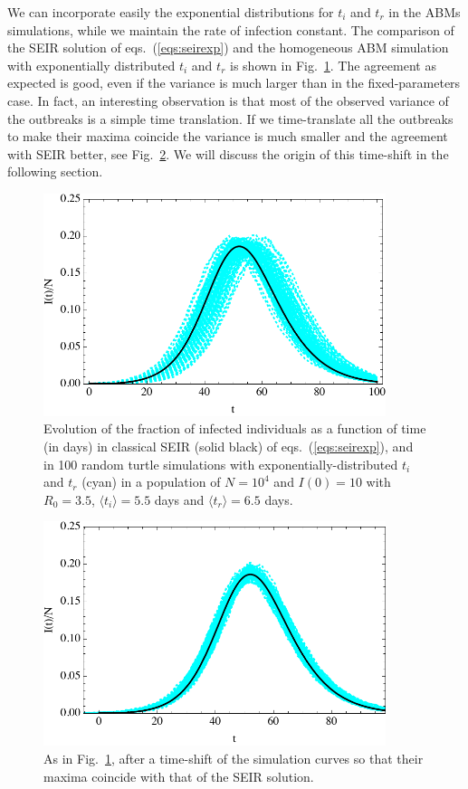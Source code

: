 \documentclass[10pt,letterpaper]{article}
\begin{document}
We can incorporate easily  the exponential distributions for $t_i$ and $t_r$ in the ABMs simulations, while we maintain the rate of infection constant. 
The comparison of the SEIR solution of eqs.~(\ref{eqs:seirexp}) and the homogeneous ABM simulation with exponentially distributed $t_i$ and $t_r$ is shown in Fig.~\ref{fig:exp}. The agreement as expected is good, even if the variance is much larger than in the fixed-parameters case. In fact, an interesting observation is that most of the observed variance 
of the outbreaks is a simple time translation. If we time-translate all the outbreaks to make their maxima coincide the variance is much smaller and the agreement with SEIR better, see Fig.~\ref{fig:expshift}. We will discuss the origin of this time-shift in the following section. 
\begin{figure}[h!]
  \centering
  \includegraphics[width=10cm]{exp.pdf}
  \caption{ Evolution of the fraction of infected individuals as a function of time (in days) in classical SEIR (solid black) of eqs.~(\ref{eqs:seirexp}), and in 100 random turtle simulations with exponentially-distributed
  $t_i$ and $t_r$ (cyan) in a  population of $N=10^4$ and $I(0)=10$ with $R_0=3.5$, $\langle t_i\rangle=5.5$ days and $\langle t_r\rangle=6.5$ days.  }
  \label{fig:exp}
   \end{figure}
   
   \begin{figure}[h!]
  \centering
  \includegraphics[width=10cm]{expshift.pdf}
  \caption{ As in Fig.~\ref{fig:exp}, after a time-shift of the simulation curves so that their maxima coincide with that of the SEIR solution.  }
  \label{fig:expshift}
   \end{figure}
\end{document}
